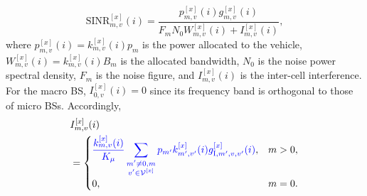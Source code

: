 \documentclass[10pt,journal,letterpaper]{journal_template/IEEEtran}
\newcommand{\rev}[1]{\textcolor{revisioncolor}{{}#1}}
\newif\ifshowdeletions
\newcommand{\currentdel}[1]{\ifshowdeletions\textcolor{deletioncolor}{\sout{#1}}\fi}
\theoremstyle{remark}
\begin{document}
\currentdel{Given allocated RBs, the instantaneous signal to interference plus noise ratio (SINR) of the desired-link from BS-$m$ to vehicle-$v$ is given by}
\begin{equation}
    \mathrm{SINR}_{m,v}^{[x]}(i) = \frac{p_{m,v}^{[x]}(i) g_{m,v}^{[x]}(i)}{F_{ m}N_0 W_{m,v}^{[x]}(i) + I_{m,v}^{[x]}(i) },
    \label{eq:SINR}
\end{equation}
where $p_{m,v}^{[x]}(i) = k_{m,v}^{[x]}(i) p_m$ is the power allocated to the vehicle, $W_{m,v}^{[x]}(i) = k_{m,v}^{[x]}(i) B_m$ is the allocated bandwidth, $N_0$ is the noise power spectral density, $F_{m}$ is the noise figure, and $I_{m,v}^{[x]}(i)$ is the inter-cell interference. For the macro BS, $I_{0,v}^{[x]}(i)=0$ since its frequency band is orthogonal to those of micro BSs. 
\currentdel{For each micro BS, since the OFDMA-based RB allocation across different BSs is assumed to be independent and uniformly random, the expected number of overlapping RBs between the set of RBs allocated by BS-$m$ to vehicle-$v$ and the set of RBs utilized by any interfering BS-$m'$ is $\frac{k_{m,v}^{[x]}(i) k_{m'}^{[x]}(i)}{K_\mu}$.}
Accordingly, \currentdel{the interference can be modeled as}
\begin{equation}
    \begin{aligned}
        & I_{m,v}^{[x]}(i) \\
        & =
        \begin{cases}
            \displaystyle
            \currentdel{\ensuremath{\sum\limits_{m'\neq 0,m} g_{{\rm I},m',v}^{[x]}(i) \frac{k_{m,v}^{[x]}(i) k_{m'}^{[x]}(i)}{K_\mu} p_{m'}}}\rev{\frac{k_{m,v}^{[x]}(i)}{K_\mu}
            \sum\limits_{\substack{m'\neq 0,m\\v'\in\mathcal V^{[x]}}}
            p_{m'}k_{m',v'}^{[x]}(i)g_{{\rm I},m',v,v'}^{[x]}(i)}, & m>0, \\
            \displaystyle
            0, & m=0.
        \end{cases}
    \end{aligned}
    \label{eq:interference}
\end{equation}
\end{document}
